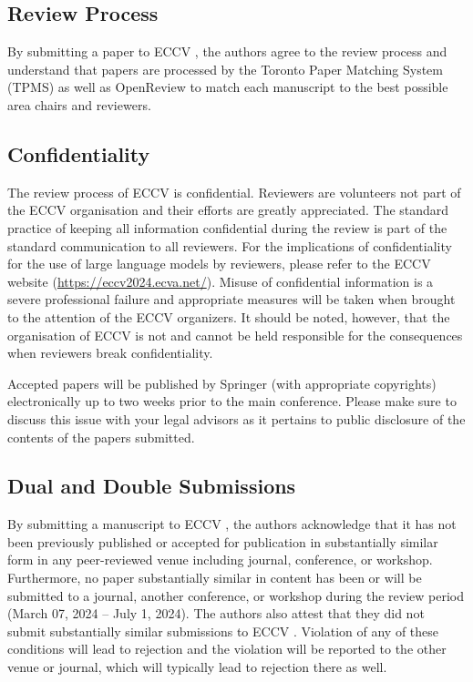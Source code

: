 \documentclass[runningheads]{llncs}
\begin{document}
\subsection{Review Process}
By submitting a paper to ECCV \ECCVyear{}, the authors agree to the review process and understand that papers are processed by the Toronto Paper Matching System (TPMS) as well as OpenReview to match each manuscript to the best possible area chairs and reviewers.


\subsection{Confidentiality}
The review process of ECCV \ECCVyear{} is confidential. 
Reviewers are volunteers not part of the ECCV organisation and their efforts are greatly appreciated. 
The standard practice of keeping all information confidential during the review is part of the standard communication to all reviewers. 
For the implications of confidentiality for the use of large language models by reviewers, please refer to the ECCV website (\url{https://eccv2024.ecva.net/}).
Misuse of confidential information is a severe professional failure and appropriate measures will be taken when brought to the attention of the ECCV organizers. 
It should be noted, however, that the organisation of ECCV is not and cannot be held responsible for the consequences when reviewers break confidentiality.

Accepted papers will be published by Springer (with appropriate copyrights) electronically up to two weeks prior to the main conference.
Please make sure to discuss this issue with your legal advisors as it pertains to public disclosure of the contents of the papers submitted.


\subsection{Dual and Double Submissions}
By submitting a manuscript to ECCV \ECCVyear{}, the authors acknowledge that it has not been previously published or accepted for publication in substantially similar form in any peer-reviewed venue including journal, conference, or workshop. 
Furthermore, no paper substantially similar in content has been or will be submitted to a journal, another conference, or workshop during the review period (March 07, 2024 -- July 1, 2024). 
The authors also attest that they did not submit substantially similar submissions to ECCV \ECCVyear{}. 
Violation of any of these conditions will lead to rejection and the violation will be reported to the other venue or journal, which will typically lead to rejection there as well. 
\end{document}
